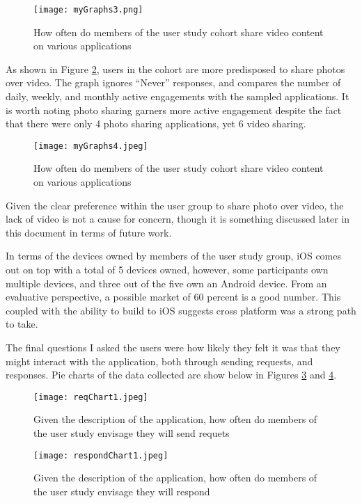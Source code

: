 \documentclass[a4paper]{article}
\begin{document}
\begin{figure}[H]
\centering
\texttt{[image: myGraphs3.png]}
\caption{How often do members of the user study cohort share video content on various applications}
\label{fig:myGraphs3}
\end{figure}

As shown in Figure \ref{fig:myGraphs4}, users in the cohort are more predisposed to share photos over video. 
The graph ignores ``Never'' responses, and compares the number of daily, weekly, and monthly active engagements with the sampled applications. It is worth noting photo sharing garners more active engagement despite the fact that there were only 4 photo sharing applications, yet 6 video sharing.
\begin{figure}[H]
\centering
\texttt{[image: myGraphs4.jpeg]}
\caption{How often do members of the user study cohort share video content on various applications}
\label{fig:myGraphs4}
\end{figure}

Given the clear preference within the user group to share photo over video, the lack of video is not a cause for concern, though it is something discussed later in this document in terms of future work.


In terms of the devices owned by members of the user study group, iOS comes out on top with a total of 5 devices owned, however, some participants own multiple devices, and three out of the five own an Android device. From an evaluative perspective, a possible market of 60 percent is a good number. This coupled with the ability to build to iOS suggests cross platform was a strong path to take.

The final questions I asked the users were how likely they felt it was that they might interact with the application, both through sending requests, and responses. Pie charts of the data collected are show below in Figures \ref{fig:reqChart1} and \ref{fig:respondChart1}.
\begin{figure}[H]
\centering
\texttt{[image: reqChart1.jpeg]}
\caption{ Given the description of the application, how often do members of the user study envisage they will send requets
}
\label{fig:reqChart1}
\end{figure}
\begin{figure}[H]
\centering
\texttt{[image: respondChart1.jpeg]}
\caption{Given the description of the application, how often do members of the user study envisage they will respond}
\label{fig:respondChart1}
\end{figure}
\end{document}
